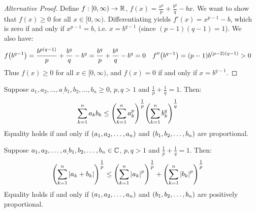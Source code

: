 \documentclass[main.tex]{subfiles}
\begin{document}
\begin{proof}[Alternative Proof]
    Define $f:[0,\infty)\to\R$, $f(x)=\frac{x^p}{p}+\frac{b^q}{q}-bx$. We want to show that $f(x)\ge 0$ for all $x\in[0,\infty)$. Differentiating yields $f'(x)=x^{p-1}-b$, which is zero if and only if $x^{p-1}=b$, i.e. $x=b^{q-1}$ (since $(p-1)(q-1)=1$). We also have:
    \begin{align*}
        f\qty(b^{q-1})
        = \frac{b^{p(q-1)}}{p}+\frac{b^q}{q}-b^q
        = \frac{b^q}{p} + \frac{b^q}{q} - b^q
        = 0
        &&
        f''\qty(b^{q-1})
        = (p-1)b^{(p-2)(q-1)}
        > 0
    \end{align*}
    Thus $f(x)\ge 0$ for all $x\in[0,\infty)$, and $f(x)=0$ if and only if $x=b^{q-1}$. 
\end{proof}

\begin{theorem}
    Suppose $a_1,a_2,\ldots,a_,b_1,b_2,\ldots,b_n\ge 0$, $p,q>1$ and $\frac{1}{p}+\frac{1}{q}=1$. Then:
    \begin{equation}\label{holder_inequality_eq}
        \sum_{k=1}^n a_kb_k \le \qty(\sum_{k=1}^n a_k^p)^{\tfrac{1}{p}}\qty(\sum_{k=1}^n b_k^q)^{\tfrac{1}{q}}
    \end{equation}
    Equality holds if and only if $\qty(a_1,a_2,\ldots,a_n)$ and $\qty(b_1,b_2,\ldots,b_n)$ are proportional.
\end{theorem}

\begin{theorem}
    Suppose $a_1,a_2,\ldots,a_,b_1,b_2,\ldots,b_n\in\C$, $p,q>1$ and $\frac{1}{p}+\frac{1}{q}=1$. Then:
    \begin{equation}\label{minkowski_inequality_eq}
        \qty(\sum_{k=1}^n \abs{a_k+b_k})^{\tfrac{1}{p}} \le \qty(\sum_{k=1}^n \abs{a_k}^p)^{\tfrac{1}{p}} + \qty(\sum_{k=1}^n \abs{b_k}^p)^{\tfrac{1}{p}}
    \end{equation}
    Equality holds if and only if $\qty(a_1,a_2,\ldots,a_n)$ and $\qty(b_1,b_2,\ldots,b_n)$ are positively proportional.
\end{theorem}
\end{document}
